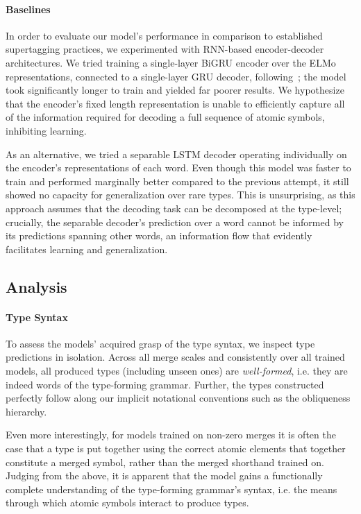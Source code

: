 \paragraph{Baselines}
In order to evaluate our model's performance in comparison to established supertagging practices, we experimented with RNN-based encoder-decoder architectures. 
We tried training a single-layer BiGRU encoder over the ELMo representations, connected to a single-layer GRU decoder, following~\cite{gru}; the model took significantly longer to train and yielded far poorer results.
We hypothesize that the encoder's fixed length representation is unable to efficiently capture all of the information required for decoding a full sequence of atomic symbols, inhibiting learning.

As an alternative, we tried a separable LSTM decoder operating individually on the encoder's representations of each word. 
Even though this model was faster to train and performed marginally better compared to the previous attempt, it still showed no capacity for generalization over rare types. 
This is unsurprising, as this approach assumes that the decoding task can be decomposed at the type-level; crucially, the separable decoder's prediction over a word cannot be informed by its predictions spanning other words, an information flow that evidently facilitates learning and generalization.

\subsection{Analysis}
\paragraph{Type Syntax}
To assess the models' acquired grasp of the type syntax, we inspect type predictions in isolation.
Across all merge scales and consistently over all trained models, all produced types (including unseen ones) are \textit{well-formed}, i.e. they are indeed words of the type-forming grammar.
Further, the types constructed perfectly follow along our implicit notational conventions such as the obliqueness hierarchy.

Even more interestingly, for models trained on non-zero merges it is often the case that a type is put together using the correct atomic elements that together constitute a merged symbol, rather than the merged shorthand trained on.
Judging from the above, it is apparent that the model gains a functionally complete understanding of the type-forming grammar's syntax, i.e. the means through which atomic symbols interact to produce types.

